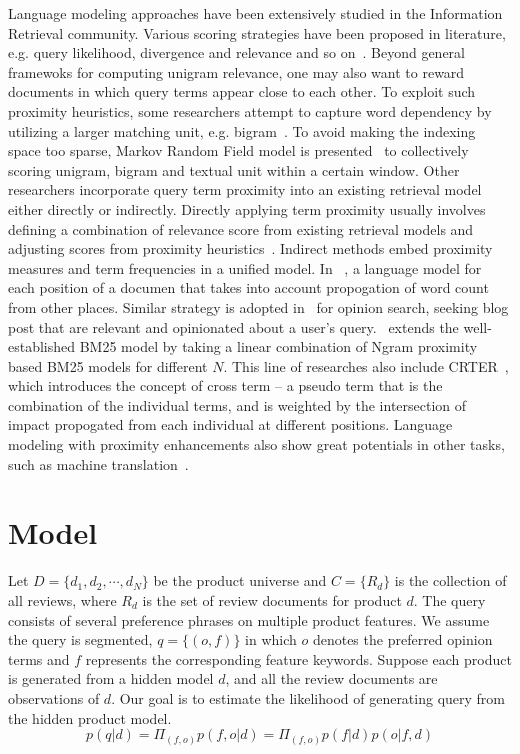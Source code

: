 \documentclass[preprint]{elsarticle}
\begin{document}
Language modeling approaches have been extensively studied in the Information Retrieval community. Various scoring strategies have been proposed in literature, e.g. query likelihood, divergence and relevance and so on~\cite{Zhai2008Statistical}. Beyond general framewoks for computing unigram relevance, one may also want to reward documents in which query terms appear close to each other. To exploit such proximity heuristics, some researchers attempt to capture word dependency by utilizing a larger matching unit, e.g. bigram~\cite{Srikanth2003Incorporating}. To avoid making the indexing space too sparse, Markov Random Field model is presented~\cite{Metzler2005Markov} to collectively scoring unigram, bigram and textual unit within a certain window. Other researchers incorporate query term proximity into an existing retrieval model either directly or indirectly. Directly applying term proximity usually involves defining a combination of relevance score from existing retrieval models and adjusting scores from proximity heuristics~\cite{Buttcher2006Term,Tao2007Exploration}. Indirect methods embed proximity measures and term frequencies in a unified model. In ~\cite{Lv2009Positional}, a language model for each position of a documen that takes into account propogation of word count from other places. Similar strategy is adopted in~\cite{Gerani2010Proximity} for opinion search, seeking blog post that are relevant and opinionated about a user's query. ~\cite{He2011Modeling}extends the well-established BM25 model by taking a linear combination of Ngram proximity based BM25 models for different $N$. This line of researches also include CRTER~\cite{Zhao2014Modeling}, which introduces the concept of cross term -- a pseudo term that is the combination of the individual terms, and is weighted by the intersection of impact propogated from each individual at different positions. Language modeling with proximity enhancements also show great potentials in other tasks, such as machine translation~\cite{Tu2013Exploiting}. 




\section{Model}\label{sec:model}

 Let $D=\{d_1,d_2,\cdots,d_N\}$ be the product universe and $C=\{R_d\}$ is the collection of all reviews, where $R_d$ is the set of review documents for product $d$. The query consists of several preference phrases on multiple product features. We assume the query is segmented, $q=\{(o,f)\}$ in which $o$ denotes the preferred opinion terms and $f$ represents the corresponding feature keywords. Suppose each product is generated from a hidden model $d$, and all the review documents are observations of $d$. Our goal is to estimate the likelihood of generating query from the hidden product model.
\begin{equation}
p(q|d)=\Pi_{(f,o)} p(f,o|d)=\Pi_{(f,o)} p(f|d)p(o|f,d)
\label{equ:likelihood}
\end{equation}
\end{document}
